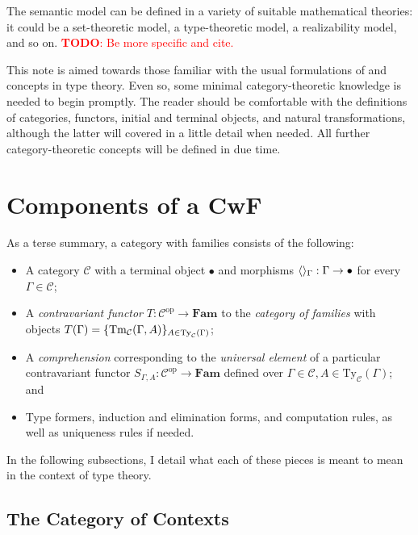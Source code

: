 \documentclass{article}
\newcommand{\todo}[1]{\textcolor{red}{\textbf{TODO}: #1}}
\renewcommand{\_}{\textrm{\textscale{.5}{\textunderscore}}}
\DeclarePairedDelimiter{\ctxt}{\langle}{\rangle}
\DeclarePairedDelimiter{\set}{\{}{\}}
\newcommand{\op}[1]{#1^{\mathrm{op}}}
\newcommand{\cat}[1]{\textbf{#1}}
\newcommand{\Tm}{\mathrm{Tm}}
\newcommand{\Ty}{\mathrm{Ty}}
\theoremstyle{definition}
\theoremstyle{plain}
\begin{document}
The semantic model can be defined in a variety of suitable mathematical theories: it could be a set-theoretic model, a type-theoretic model, a realizability model, and so on. \todo{Be more specific and cite.}

This note is aimed towards those familiar with the usual formulations of and concepts in type theory.
Even so, some minimal category-theoretic knowledge is needed to begin promptly.
The reader should be comfortable with the definitions of categories, functors, initial and terminal objects, and natural transformations,
although the latter will covered in a little detail when needed.
All further category-theoretic concepts will be defined in due time.

\section{Components of a CwF}

As a terse summary, a category with families consists of the following:

\begin{itemize}
    \item A category $\mathcal{C}$ with a terminal object $\bullet$ and morphisms $\ctxt{}_\Gamma : \Gamma \to \bullet$
    for every $\Gamma \in \mathcal{C}$;
    \item A \emph{contravariant functor} $T : \op{\mathcal{C}} \to \cat{Fam}$ to the \emph{category of families}
    with objects $T(\Gamma) = \set{\Tm_{\mathcal{C}}(\Gamma, A)}_{A \in \Ty_{\mathcal{C}}(\Gamma)}$;
    \item A \emph{comprehension} corresponding to the \emph{universal element} of a particular contravariant functor $S_{\Gamma, A} : \op{\mathcal{C}} \to \cat{Fam}$ defined over $\Gamma \in \mathcal{C}, A \in \Ty_{\mathcal{C}}(\Gamma)$; and
    \item Type formers, induction and elimination forms, and computation rules, as well as uniqueness rules if needed.
\end{itemize}

In the following subsections, I detail what each of these pieces is meant to mean in the context of type theory.

\subsection{The Category of Contexts}
\end{document}
